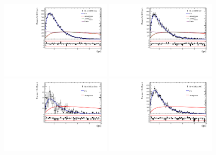 

\clearpage






\clearpage

\begin{figure}[h]
\includegraphics[height=!,width=0.49\textwidth]{figs/Acceptance/adaptive_N4/timeAccRatioFit_norm_Run1_t0.pdf}
\includegraphics[height=!,width=0.49\textwidth]{figs/Acceptance/adaptive_N4/timeAccRatioFit_norm_MC_Run1_t0.pdf}
\includegraphics[height=!,width=0.49\textwidth]{figs/Acceptance/adaptive_N4/timeAccRatioFit_signal_B0_Run1_t0.pdf}
\includegraphics[height=!,width=0.49\textwidth]{figs/Acceptance/adaptive_N4/timeAccRatioFit_signal_MC_Run1_t0.pdf}

\end{figure}
